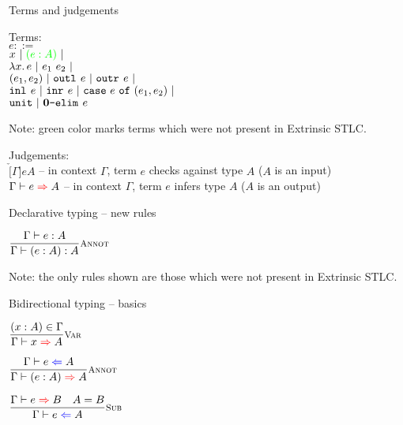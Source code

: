 \documentclass{beamer}
\begin{document}
\begin{frame}{Terms and judgements}

Terms: \\
$e ::=$ \\
\qquad $x \pipe \newterm{\annot{e}{A}} \pipe$ \\
\qquad $\fun{x}{e} \pipe \app{e_1}{e_2} \pipe$ \\
\qquad $(e_1, e_2) \ |\  \texttt{outl}_{}\ e \ |\  \texttt{outr}_{}\ e \ |\ $ \\
\qquad $\texttt{inl}_{}\ e \ |\  \texttt{inr}_{}\ e \ |\  \texttt{case}\ e\ \texttt{of}\ (e_1, e_2) \ |\ $ \\
\qquad $\texttt{unit} \ |\  \textbf{0}\texttt{-elim}_{}\ e$

\vspace{1em}

Note: green color marks terms which were not present in Extrinsic STLC.

\vspace{1em}

Judgements: \\
$\check[\Gamma]{e}{A}$ -- in context $\Gamma$, term $e$ checks against type $A$ ($A$ is an input) \\
$\infer[\Gamma]{e}{A}$ -- in context $\Gamma$, term $e$ infers type $A$ ($A$ is an output)

\end{frame}

\begin{frame}{Declarative typing -- new rules}

\begin{center}
  $\infrule[Annot]{\typing{e}{A}}{\typing{\annot{e}{A}}{A}}$
\end{center}

\vspace{2em}

Note: the only rules shown are those which were not present in Extrinsic STLC.

\end{frame}

\begin{frame}{Bidirectional typing -- basics}

\begin{center}
  $\infrule[Var]{\sidecond{(x : A) \in \Gamma}}{\infer{x}{A}}$

  \vspace{2em}

  $\infrule[Annot]{\check{e}{A}}{\infer{\annot{e}{A}}{A}}$

  \vspace{2em}

  $\infrule[Sub]{\infer{e}{B} \quad \sidecond{A = B}}{\check{e}{A}}$
\end{center}

\end{frame}
\end{document}
